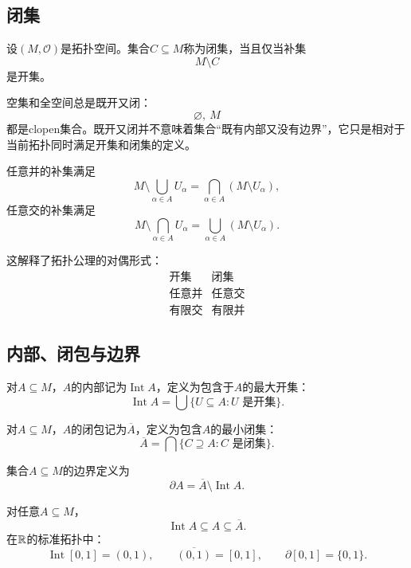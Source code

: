 \subsection{闭集}

\begin{definition}[闭集]
设$(M,\mathcal O)$是拓扑空间。集合$C\subseteq M$称为闭集，当且仅当补集
\[
    M\setminus C
\]
是开集。
\end{definition}

空集和全空间总是既开又闭：
\[
    \varnothing,\ M
\]
都是clopen集合。既开又闭并不意味着集合“既有内部又没有边界”，它只是相对于当前拓扑同时满足开集和闭集的定义。

\begin{lemma}[开闭对偶]
任意并的补集满足
\[
    M\setminus\bigcup_{\alpha\in A}U_\alpha
    =
    \bigcap_{\alpha\in A}(M\setminus U_\alpha),
\]
任意交的补集满足
\[
    M\setminus\bigcap_{\alpha\in A}U_\alpha
    =
    \bigcup_{\alpha\in A}(M\setminus U_\alpha).
\]
\end{lemma}

这解释了拓扑公理的对偶形式：
\[
\begin{array}{c|c}
\text{开集}&\text{闭集}\\
\hline
\text{任意并}&\text{任意交}\\
\text{有限交}&\text{有限并}
\end{array}
\]

\subsection{内部、闭包与边界}

\begin{definition}[内部]
对$A\subseteq M$，$A$的内部记为$\operatorname{Int}A$，定义为包含于$A$的最大开集：
\[
    \operatorname{Int}A
    =
    \bigcup\{U\subseteq A:U\text{ 是开集}\}.
\]
\end{definition}

\begin{definition}[闭包]
对$A\subseteq M$，$A$的闭包记为$\overline A$，定义为包含$A$的最小闭集：
\[
    \overline A
    =
    \bigcap\{C\supseteq A:C\text{ 是闭集}\}.
\]
\end{definition}

\begin{definition}[边界]
集合$A\subseteq M$的边界定义为
\[
    \partial A
    =
    \overline A\setminus\operatorname{Int}A.
\]
\end{definition}

对任意$A\subseteq M$，
\[
    \operatorname{Int}A\subseteq A\subseteq\overline A.
\]
在$\mathbb{R}$的标准拓扑中：
\[
    \operatorname{Int}[0,1]=(0,1),
    \qquad
    \overline{(0,1)}=[0,1],
    \qquad
    \partial[0,1]=\{0,1\}.
\]

